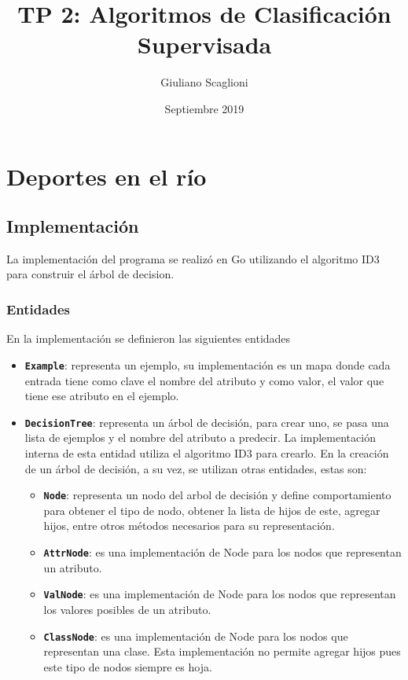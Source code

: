 \documentclass[a4paper]{article}
\title{TP 2: Algoritmos de Clasificación Supervisada}
\author{Giuliano Scaglioni}
\date{Septiembre 2019}
\newcommand{\bold}[1]{\textbf{\texttt{#1}}}
\begin{document}
\clearpage\maketitle
\thispagestyle{empty}

\newpage

\setcounter{page}{1}

\section{Deportes en el río}
  \subsection{Implementación}
  La implementación del programa se realizó en Go utilizando el algoritmo ID3 para construir el árbol de decision.

  \subsubsection{Entidades}
    En la implementación se definieron las siguientes entidades
    \begin{itemize}
      \item \bold{Example}: representa un ejemplo, su implementación es un mapa donde cada entrada tiene como clave el nombre del atributo y como valor, el valor que tiene ese atributo en el ejemplo.
      \item \bold{DecisionTree}: representa un árbol de decisión, para crear uno, se pasa una lista de ejemplos y el nombre del atributo a predecir. La implementación interna de esta entidad utiliza el algoritmo ID3 para crearlo. En la creación de un árbol de decisión, a su vez, se utilizan otras entidades, estas son:
      \begin{itemize}
        \item \bold{Node}: representa un nodo del arbol de decisión y define comportamiento para obtener el tipo de nodo, obtener la lista de hijos de este, agregar hijos, entre otros métodos necesarios para su representación.
        \item \bold{AttrNode}: es una implementación de Node para los nodos que representan un atributo.
        \item \bold{ValNode}: es una implementación de Node para los nodos que representan los valores posibles de un atributo.
        \item \bold{ClassNode}: es una implementación de Node para los nodos que representan una clase. Esta implementación no permite agregar hijos pues este tipo de nodos siempre es hoja.
      \end{itemize}
    \end{itemize}
\end{document}
